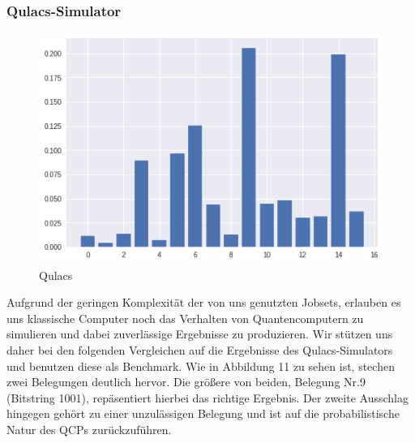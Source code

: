 \subsubsection{Qulacs-Simulator}
\begin{figure}
\begin{center}
	\vspace{-15pt}
    \includegraphics[width=1\linewidth]{images/Qulacs_pre-op_20.png}
  \end{center}
  \caption{Qulacs}
  \vspace{-10pt}
\end{figure}
Aufgrund der geringen Komplexität der von uns genutzten Jobsets, erlauben es uns klassische Computer noch das Verhalten von Quantencomputern zu simulieren und dabei zuverlässige Ergebnisse zu produzieren.
Wir stützen uns daher bei den folgenden Vergleichen auf die Ergebnisse des Qulacs-Simulators und benutzen diese als Benchmark.
Wie in Abbildung 11 zu sehen ist, stechen zwei Belegungen deutlich hervor. Die größere von beiden, Belegung Nr.9 (Bitstring 1001), repäsentiert hierbei das richtige Ergebnis. Der zweite Ausschlag hingegen gehört zu einer unzulässigen Belegung und ist auf die probabilistische Natur des QCPs zurückzuführen.
    
